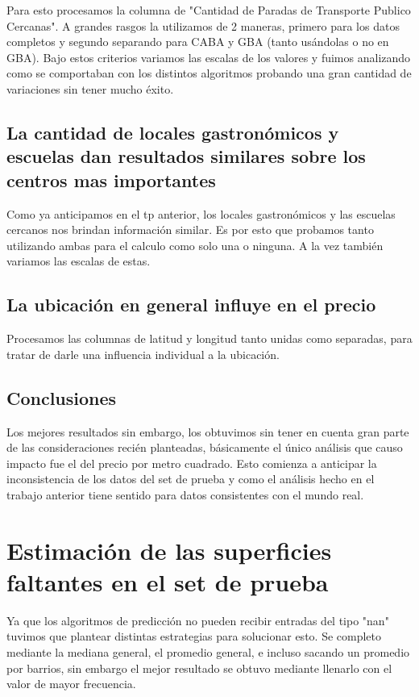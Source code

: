 \documentclass[a4paper, 10pt]{article}
\begin{document}
		Para esto procesamos la columna de "Cantidad de Paradas de Transporte Publico Cercanas". A grandes rasgos la utilizamos de 2 maneras, primero para los datos completos y segundo separando para CABA y GBA (tanto usándolas o no en GBA). Bajo estos criterios variamos las escalas de los valores y fuimos analizando como se comportaban con los distintos algoritmos probando una gran cantidad de variaciones sin tener mucho éxito.

		\subsection{La cantidad de locales gastronómicos y escuelas dan resultados similares sobre los centros mas importantes} 
		
		Como ya anticipamos en el tp anterior, los locales gastronómicos y las escuelas cercanos nos brindan información similar. Es por esto que probamos tanto utilizando ambas para el calculo como solo una o ninguna. A la vez también variamos las escalas de estas. 
			
		\subsection{La ubicación en general influye en el precio}
		Procesamos las columnas de latitud y longitud tanto unidas como separadas, para tratar de darle una influencia individual a la ubicación.
		
		\subsection{Conclusiones}
		Los mejores resultados sin embargo, los obtuvimos sin tener en cuenta gran parte de las consideraciones recién planteadas, básicamente el único análisis que causo impacto fue el del precio por metro cuadrado. Esto comienza a anticipar la inconsistencia de los datos del set de prueba y como el análisis hecho en el trabajo anterior tiene sentido para datos consistentes con el mundo real. 		
		
		
	\section{Estimación de las superficies faltantes en el set de prueba}
		Ya que los algoritmos de predicción no pueden recibir entradas del tipo "nan" tuvimos que plantear distintas estrategias para solucionar esto. Se completo mediante la mediana general, el promedio general, e incluso sacando un promedio por barrios, sin embargo el mejor resultado se obtuvo mediante llenarlo con el valor de mayor frecuencia.
		
\end{document}
